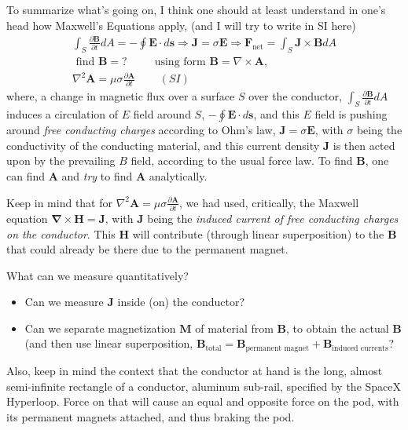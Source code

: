 \documentclass[10pt]{amsart}
\begin{document}
\begin{multicols*}{2}
To summarize what's going on, I think one should at least understand in one's head how Maxwell's Equations apply, (and I will try to write in SI here)
\begin{equation}
\boxed{
\begin{gathered}
\int_S \frac{ \partial \mathbf{B}}{ \partial t} dA = -\oint \mathbf{E}\cdot d\mathbf{s} \Longrightarrow \mathbf{J}=\sigma \mathbf{E} \Longrightarrow \mathbf{F}_{\text{net}} = \int_S \mathbf{J} \times \mathbf{B} dA  \\
\text{ find } \mathbf{B} = ? \qquad \, \text{ using form } \mathbf{B} = \nabla \times \mathbf{A}, \\
\nabla^2 \mathbf{A} = \mu \sigma \frac{ \partial \mathbf{A} }{ \partial t} \qquad \, (SI)
\end{gathered}
}
\end{equation}
where, a change in magnetic flux over a surface $S$ over the conductor, $\int_S \frac{ \partial \mathbf{B}}{ \partial t}dA$ induces a circulation of $E$ field around $S$, $-\oint \mathbf{E} \cdot d\mathbf{s}$, and this $E$ field is pushing around \emph{free conducting charges} according to Ohm's law, $\mathbf{J} = \sigma \mathbf{E}$, with $\sigma$ being the conductivity of the conducting material, and this current density $\mathbf{J}$ is then acted upon by the prevailing $B$ field, according to the usual force law.  To find $\mathbf{B}$, one can find $\mathbf{A}$ and \emph{try} to find $\mathbf{A}$ analytically.  

Keep in mind that for $\nabla^2 \mathbf{A} = \mu \sigma \frac{ \partial \mathbf{A}}{ \partial t}$, we had used, critically, the Maxwell equation $\mathbf{\nabla} \times \mathbf{H} = \mathbf{J}$, with $\mathbf{J}$ being the \emph{induced current of free conducting charges on the conductor}.  This $\mathbf{H}$ will contribute (through linear superposition) to the $\mathbf{B}$ that could already be there due to the permanent magnet.  

What can we measure quantitatively?
\begin{itemize}
\item Can we measure $\mathbf{J}$ inside (on) the conductor?
\item Can we separate magnetization $\mathbf{M}$ of material from $\mathbf{B}$, to obtain the actual $\mathbf{B}$ (and then use linear superposition, $\mathbf{B}_{\text{total}} = \mathbf{B}_{\text{permanent magnet}} + \mathbf{B}_{\text{induced currents}}$? 
\end{itemize}

Also, keep in mind the context that the conductor at hand is the long, almost semi-infinite rectangle of a conductor, aluminum sub-rail, specified by the SpaceX Hyperloop.  Force on that will cause an equal and opposite force on the pod, with its permanent magnets attached, and thus braking the pod.   




 


\end{multicols*}
\end{document}
